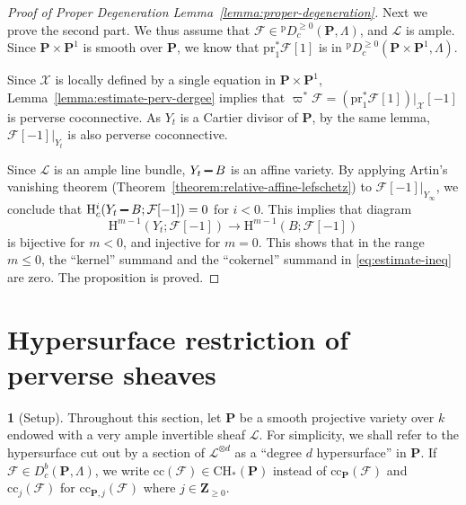 \documentclass[english]{smfart}
\renewcommand{\setminus}{\mathbin{\rule[0.2em]{0.67em}{0.12em}}}%
\renewcommand{\mathbb}{\mathbf}
\renewcommand{\leq}{\leqslant}
\renewcommand{\geq}{\geqslant}
\theoremstyle{remark}
\theoremstyle{plain}
\theoremstyle{definition}
\numberwithin{equation}{remark}
\theoremstyle{void}
\newtheorem{situation}[remark]{}
\begin{document}
\begin{proof}[Proof of Proper Degeneration Lemma~\ref{lemma:proper-degeneration}]
Next we prove the second part.  We thus assume that
\(\mathcal{F} \in {}^{\mathrm{p}}D_{c}^{\geq 0}({\mathbb{P}},\Lambda)\), and
\(\mathscr{L}\) is ample.  Since \(\mathbb{P} \times \mathbb{P}^1\) is
smooth over \(\mathbb{P}\), we know that
\(\mathrm{pr}_1^{\ast}\mathcal{F}[1]\) is in
\({}^{\mathrm{p}}D_c^{\geq0}(\mathbb{P}\times \mathbb{P}^1,\Lambda)\).

Since \(\mathcal{X}\) is locally defined by a single
equation in \(\mathbb{P} \times \mathbb{P}^1\),
Lemma~\ref{lemma:estimate-perv-dergee} implies that
\(\varpi^{\ast}\mathcal{F}=(\mathrm{pr}_1^{\ast}\mathcal{F}[1])|_{\mathcal{X}}[-1]\)
is perverse coconnective.  As \(Y_{t}\) is a Cartier divisor
of \(\mathbb{P}\), by the same lemma, \(\mathcal{F}[-1]|_{Y_{t}}\)
is also perverse coconnective.

Since \(\mathscr{L}\) is an ample line bundle, \(Y_{t} \setminus B\)
is an affine variety.  By applying Artin's vanishing theorem
(Theorem~\ref{theorem:relative-affine-lefschetz}) to
\(\mathcal{F}[-1]|_{Y_{\infty}}\), we conclude that
\(\mathrm{H}^i_c(Y_{t} \setminus B;\mathcal{F}[-1]) = 0\) for
\(i < 0\).  This implies that diagram
\begin{equation*}
\mathrm{H}^{m-1}(Y_{t};\mathcal{F}[-1]) \to \mathrm{H}^{m-1}(B;\mathcal{F}[-1])
\end{equation*}
is bijective for \(m<0\), and injective for \(m=0\).  This shows that
in the range \(m\leq 0\), the ``kernel'' summand and the ``cokernel''
summand in \eqref{eq:estimate-ineq} are zero.  The proposition is
proved.
\end{proof}


\section{Hypersurface restriction of perverse sheaves }
\label{sec:main-theorem}
\begin{situation}[Setup]\label{setup}
Throughout this section, let \(\mathbb{P}\) be a smooth projective
variety over \(k\) endowed with a very ample invertible sheaf
\(\mathscr{L}\).  For simplicity, we shall refer to the hypersurface
cut out by a section of \(\mathscr{L}^{\otimes d}\) as a ``degree
\(d\) hypersurface'' in \(\mathbb{P}\).  If
\(\mathcal{F} \in D^b_c(\mathbb{P},\Lambda)\), we write
\(\mathrm{cc}(\mathcal{F}) \in \mathrm{CH}_{\ast}(\mathbb{P})\)
instead of \(\mathrm{cc}_{\mathbb{P}}(\mathcal{F})\) and \(\mathrm{cc}_j(\mathcal{F})\) for \(\mathrm{cc}_{\mathbb{P},j}(\mathcal{F})\) where \(j \in \mathbb{Z}_{\geq0}\).
\end{situation}
\end{document}
